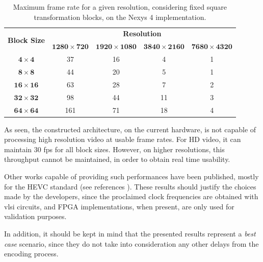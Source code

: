 \begin{table}[!htpb]
    \centering
    \caption{Maximum frame rate for a given resolution, considering fixed square transformation blocks, on the Nexys 4 implementation.}
    \begin{tabular}{ccccc} \toprule
        \multirow{2}{*}{\textbf{Block Size}}   & \multicolumn{4}{c}{\textbf{Resolution}}                      \\
                                         & $\mathbf{1280\times 720}$    & $\mathbf{1920\times 1080}$  & $\mathbf{3840\times 2160}$  & $\mathbf{7680\times 4320}$  \\ \toprule
        $\mathbf{4\times 4}$                       & 37                      & 16                   & 4                    & 1  \\
        $\mathbf{8\times 8}$                       & 44                      & 20                   & 5                    & 1  \\
        $\mathbf{16\times 16}$                      & 63                      & 28                   & 7                    & 2  \\
        $\mathbf{32\times 32}$                      & 98                      & 44                   & 11                   & 3  \\
        $\mathbf{64\times 64}$                      & 161                     & 71                   & 18                   & 4  \\
        \bottomrule
    \end{tabular}    
    \label{tab:maxfps}
\end{table}

As seen, the constructed architecture, on the current hardware, is not capable of processing high resolution video at usable frame rates. For HD video, it can maintain 30 fps for all block sizes. However, on higher resolutions, this throughput cannot be maintained, in order to obtain real time usability. 

Other works capable of providing such performances have been published, mostly for the HEVC standard (see references \cite{vayalilEfficientASICDesign2016,meherEfficientIntegerDCT2014,m.HighPerformanceInteger2017}). These results should justify the choices made by the developers, since the proclaimed clock frequencies are obtained with \gls{vlsi} circuits, and FPGA implementations, when present, are only used for validation purposes.

In addition, it should be kept in mind that the presented results represent a \emph{best case} scenario, since they do not take into consideration any other delays from the encoding process.

